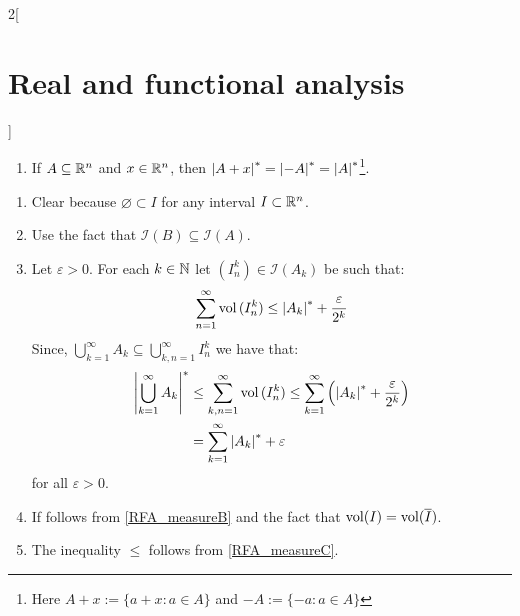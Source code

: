 \documentclass[../../../main_math.tex]{subfiles}
\begin{document}
\begin{multicols}{2}[\section{Real and functional analysis}]
\begin{theorem}
\begin{enumerate}
            \item\label{RFA_measureG} If $A\subseteq\mathbb{R}^n$ and $x\in\mathbb{R}^n$, then $\om{A+x}=\om{-A}=\om{A}$\footnote{Here $A+x:=\{a+x:a\in A\}$ and $-A:=\{-a:a\in A\}$}.
    \end{enumerate}
  \end{theorem}
  \begin{sproof}
    \begin{enumerate}
      \item Clear because $\varnothing\subset I$ for any interval $I\subset\mathbb{R}^n$.
      \item Use the fact that $\mathcal{I}(B)\subseteq\mathcal{I}(A)$.
      \item Let $\varepsilon>0$. For each $k\in\mathbb{N}$ let $(I_n^k)\in\mathcal{I}(A_k)$ be such that: $$\sum_{n=1}^\infty\vol{(I_n^k)}\leq\om{A_k}+\frac{\varepsilon}{2^k}$$
            Since, $\bigcup_{k=1}^\infty A_k\subseteq \bigcup_{k,n=1}^\infty I_n^k$ we have that:
            \begin{align*}
              \om{\bigcup_{k=1}^\infty A_k} & \leq \sum_{k,n=1}^\infty\vol{(I_n^k)}\leq\sum_{k= 1}^\infty\left(\om{A_k}+\frac{\varepsilon}{2^k}\right) \\
                                            & =\sum_{k=1}^\infty \om{A_k}+\varepsilon
            \end{align*}
            for all $\varepsilon>0$.
      \item If follows from \cref{RFA_measureB} and the fact that $\operatorname{vol}(I)=\operatorname{vol}(\overline{I})$.
      \item The inequality $\leq$ follows from \cref{RFA_measureC}.


\end{enumerate}
\end{sproof}
\end{multicols}
\end{document}
